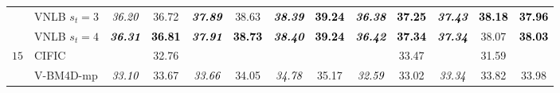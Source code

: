 \documentclass[10pt, a4paper]{article}
\newcommand{\best}[1]{#1}
\newcommand{\bsic}[1]{\textcolor{black}{\textit{#1}}}
\newcommand{\Bsic}[1]{\textcolor{black}{\textbf{\textit{#1}}}}
\newcommand{\Best}[1]{\textbf{\textcolor{black}{#1}}}
\begin{document}
\begin{table}[htp!]
\begin{center}
{\begin{tabular}{ c | l |c c | c c | c c | c c | c c | c}
			                      & VNLB   $s_t = 3$     & \bsic{36.20} &       36.72  & \Bsic{37.89} &       38.63  & \Bsic{38.39} & \Best{39.24} & \Bsic{36.38} & \Best{37.25} & \Bsic{37.43} & \Best{38.18} & \Best{37.96} \\
			                      & VNLB   $s_t = 4$     & \Bsic{36.31} & \Best{36.81} & \Bsic{37.91} & \Best{38.73} & \Bsic{38.40} & \Best{39.24} & \Bsic{36.42} & \Best{37.34} & \Bsic{37.34} &       38.07  & \Best{38.03} \\\hline
%
			\multirow{1}{*}{$15$}
			                      & CIFIC                & \bsic{     } &       32.76  & \bsic{     } &              & \bsic{     } &              & \bsic{     } &       33.47  & \bsic{     } &       31.59  &              \\
			                      & V-BM4D-mp            & \bsic{33.10} &       33.67  & \bsic{33.66} &       34.05  & \bsic{34.78} &       35.17  & \bsic{32.59} &       33.02  & \bsic{33.34} &       33.82  &       33.98  \\

\end{tabular}}
\end{center}
\end{table}
\end{document}
